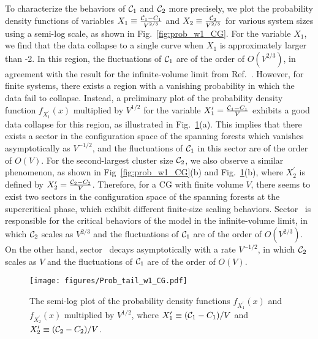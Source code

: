 To characterize the behaviors of ${\mathcal C}_1$ and ${\mathcal C}_2$ more precisely, we plot the probability density functions
of variables $X_1 \equiv \frac{{\mathcal C}_1 - C_1}{V^{2/3}}$ and $X_2 \equiv \frac{{\mathcal C}_2}{V^{2/3}}$ for various system sizes using a semi-log scale,
as shown in Fig.~\ref{fig:prob_w1_CG}. For the variable $X_1$, we find that the data collapse to a single curve when $X_1$ is approximately larger
than -2. In this region, the fluctuations of ${\mathcal C}_1$ are of the order of $O(V^{2/3})$, in agreement with the result for the infinite-volume limit from Ref.~.
However, for finite systems, there exists a region with a vanishing probability in which the data fail to collapse. Instead, a preliminary plot of the 
probability density function $f_{X_1^\prime}(x)$ multiplied by $V^{1/2}$ for the variable $X_1^\prime = \frac{{\mathcal C}_1 - C_1}{V}$ exhibits a good data collapse for this region, 
as illustrated in Fig.~\ref{fig:prob_w1_CG_tail}(a). This implies that there exists a sector in the configuration space of the spanning forests which vanishes
asymptotically as $V^{-1/2}$, and the fluctuations of ${\mathcal C}_1$ in this sector are of the order of $O(V)$. 
For the second-largest cluster size ${\mathcal C}_2$, we also observe a similar phenomenon, as shown in Fig~\ref{fig:prob_w1_CG}(b) 
and Fig.~\ref{fig:prob_w1_CG_tail}(b), where $X_2^\prime$ is defined by $X_2^\prime = \frac{{\mathcal C}_2 - C_2}{V}$. 
Therefore, for a CG with finite volume $V$, there seems to exist two sectors in the configuration space of the spanning forests at the supercritical phase, which exhibit different finite-size scaling behaviors. 
Sector~ is responsible for the critical behaviors of the model in the infinite-volume limit, in which ${\mathcal C}_2$ scales as $V^{2/3}$ and the fluctuations of 
${\mathcal C}_1$ are of the order of $O(V^{2/3})$. On the other hand, sector~ decays asymptotically with a rate $V^{-1/2}$, in which ${\mathcal C}_2$ scales
as $V$ and the fluctuations of ${\mathcal C}_1$ are of the order of $O(V)$.

\begin{figure}[htb]
	\centering
	\texttt{[image: figures/Prob\_tail\_w1\_CG.pdf]}
	\caption{The semi-log plot of the probability density functions $f_{X_1^\prime}(x)$ and $f_{X_2^\prime}(x)$ multiplied by $V^{1/2}$,
	where $X_1^\prime \equiv ({\mathcal C}_1 - C_1)/V$ and $X_2^\prime \equiv ({\mathcal C}_2-C_2)/V$.}
	\label{fig:prob_w1_CG_tail}
\end{figure}

